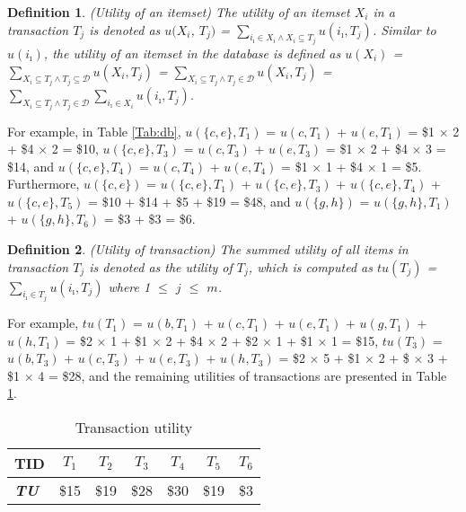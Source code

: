 \documentclass[journal]{IEEEtran}
\newtheorem{definition}{Definition}[section]
\begin{document}
\begin{definition}
	\rm  (\textit{Utility of an itemset}) The utility of an itemset $X_i$ in a transaction $T_j$ is denoted as $u(X_i$, $T_j)$ = $\sum_{i_\imath \in X_i \wedge X_i \subseteq T_j}u(i_\imath, T_j)$. Similar to $u(i_\imath)$, the utility of an itemset in the database is defined as $u(X_i)$ = $\sum_{X_i \subseteq T_j \land T_j \subseteq \mathcal{D}}u(X_i, T_j)$ = $\sum_{X_i \subseteq T_j \wedge T_j \in \mathcal{D}}u(X_i,  T_j)$ = $\sum_{X_i \subseteq T_j \wedge T_j\in \mathcal{D}}\sum_{i_\imath \in X_i}u(i_\imath,  T_j)$.
\end{definition}

For example, in Table \ref{Tab:db}, $u(\{c, e\},T_1)$ = $u(c,T_1)$ + $u(e,T_1)$ = \$1 $\times$ 2 + \$4 $\times$ 2 = \$10, $u(\{c, e\},T_3)$ = $u(c,T_3)$ + $u(e,T_3)$ = \$1 $\times$ 2 + \$4 $\times$ 3 = \$14, and $u(\{c, e\},T_4)$ = $u(c,T_4)$ + $u(e,T_4)$ = \$1 $\times$ 1 + \$4 $\times$ 1 = \$5. Furthermore, $u(\{c, e\})$ = $u(\{c, e\},T_1)$ + $u(\{c, e\},T_3)$ + $u(\{c, e\},T_4)$ + $u(\{c, e\},T_5)$ = \$10 + \$14 + \$5 + \$19 = \$48, and $u(\{g, h\})$ = $u(\{g, h\},T_1)$ + $u(\{g, h\},T_6)$ = \$3 + \$3 = \$6.


\begin{definition}
	\rm  (\textit{Utility of transaction}) The summed utility of all items in transaction $T_j$ is denoted as the utility of $T_j$, which is computed as $tu(T_j)$ = $\sum_{i_\imath \in T_j}u(i_\imath, T_j)$ where 1 $\le$ $j$ $\le$ $m$.
\end{definition}

For example, $tu(T_1)$ = $u(b, T_1)$ + $u(c, T_1)$ + $u(e, T_1)$ + $u(g, T_1)$ + $u(h, T_1)$ = \$2 $\times$ 1 + \$1 $\times$ 2 + \$4 $\times$ 2 + \$2 $\times$ 1 + \$1 $\times$ 1 = \$15, $tu(T_3)$ = $u(b, T_3)$ + $u(c, T_3)$ + $u(e, T_3)$ + $u(h, T_3)$ = \$2 $\times$ 5 + \$1 $\times$ 2 + \$ $\times$ 3 + \$1 $\times$ 4 = \$28, and the remaining utilities of transactions are presented in Table \ref{Tab:transaction_utility}.


\begin{table}[!h]
	\begin{center}
		\caption{Transaction utility}
		\label{Tab:transaction_utility}
		\begin{tabular}{lcccccc}
			\hline
			\textbf{TID} 		  & $T_1$ & $T_2$ & $T_3$ & $T_4$ & $T_5$ & $T_6$ \\ \hline
			\textbf{\textit{TU}}  & \$15  & \$19  & \$28  & \$30  & \$19  & \$3   \\ \hline
		\end{tabular}
	\end{center}
\end{table}
\end{document}
